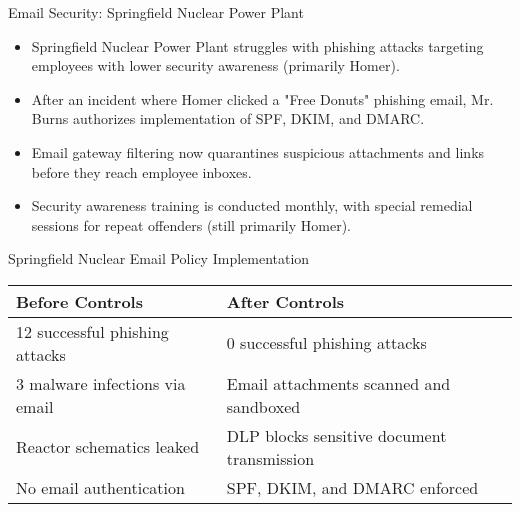 \documentclass{beamer}
\begin{document}
                    
\begin{frame}{Email Security: Springfield Nuclear Power Plant}
    \begin{itemize}
        \item Springfield Nuclear Power Plant struggles with phishing attacks targeting employees with lower security awareness (primarily Homer).
        \item After an incident where Homer clicked a "Free Donuts" phishing email, Mr. Burns authorizes implementation of SPF, DKIM, and DMARC.
        \item Email gateway filtering now quarantines suspicious attachments and links before they reach employee inboxes.
        \item Security awareness training is conducted monthly, with special remedial sessions for repeat offenders (still primarily Homer).
    \end{itemize}
    
    \begin{block}{Springfield Nuclear Email Policy Implementation}
        \scriptsize
    \begin{tabular}{ll}
    \textbf{Before Controls} & \textbf{After Controls} \\
    \hline
    12 successful phishing attacks & 0 successful phishing attacks \\
    3 malware infections via email & Email attachments scanned and sandboxed \\
    Reactor schematics leaked & DLP blocks sensitive document transmission \\
    No email authentication & SPF, DKIM, and DMARC enforced \\
    \end{tabular}
    \end{block}

\end{frame}
                    
\end{document}
